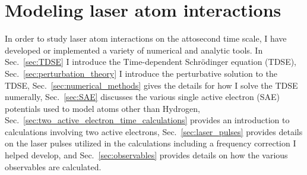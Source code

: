 \chapter{Modeling laser atom interactions}
\label{cha:numberic_methods}
In order to study laser atom interactions on the attosecond time scale, I have developed or implemented a variety of numerical and analytic tools. In Sec.~\ref{sec:TDSE} I introduce the Time-dependent Schr\"odinger equation (TDSE), Sec.~\ref{sec:perturbation_theory} I introduce the perturbative solution to the TDSE, Sec.~\ref{sec:numerical_methods} gives the details for how I solve the TDSE numerally, Sec.~\ref{sec:SAE} discusses the various single active electron (SAE) potentials used to model atoms other than Hydrogen, Sec.~\ref{sec:two_active_electron_time_calculations} provides an introduction to calculations involving two active electrons, Sec.~\ref{sec:laser_pulses} provides details on the laser pulses utilized in the calculations including a frequency correction I helped develop, and Sec.~\ref{sec:observables} provides details on how the various observables are calculated.


